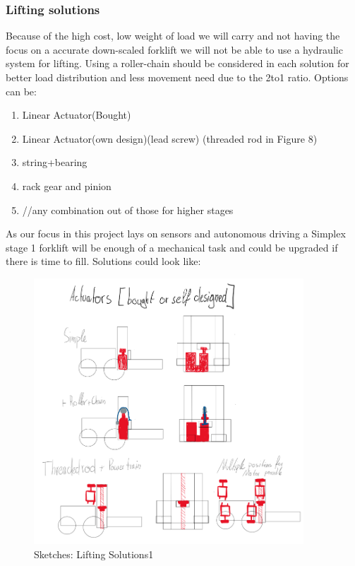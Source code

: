 \documentclass[../report.tex]{subfiles}
\begin{document}
\subsubsection{Lifting solutions}
Because of the high cost, low weight of load we will carry and not having the focus on a accurate down-scaled 
forklift we will not be able to use a hydraulic system for lifting.
Using a roller-chain should be considered in each solution for better load distribution and less movement need due to the 2to1
ratio.
Options can be:
\begin{enumerate}
    \item Linear Actuator(Bought)
    \item Linear Actuator(own design)(lead screw) (threaded rod in Figure 8)
    \item string+bearing 
    \item rack gear and pinion
    \item //any combination out of those for higher stages
\end{enumerate}
As our focus in this project lays on sensors and autonomous driving a Simplex stage 1 forklift will be enough of a mechanical 
task and could be upgraded if there is time to fill. 
Solutions could look like:
\begin{figure}[H]
    \centering
    \includegraphics[width=0.9\textwidth]{../image/Liftsolutions1.png}
    \caption{Sketches: Lifting Solutions1}
\end{figure}
   
\end{document}
